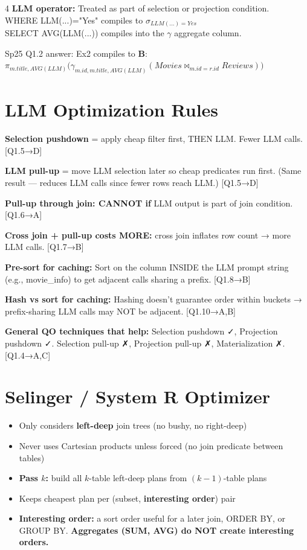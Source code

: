 \documentclass[8pt,letterpaper]{article}
\newcommand{\codefont}{\fontsize{4.2}{4.8}\selectfont\ttfamily}
\newcommand{\key}[1]{\textbf{\color{red!70!black}#1}}
\newcommand{\warn}[1]{\textbf{\color{orange!85!black}#1}}
\newcommand{\sql}[1]{{\codefont #1}}
\newcommand{\qref}[1]{{\fontsize{3.5}{4}\selectfont\color{purple!60!black}[#1]}}
\newcommand{\proj}{\ensuremath{\pi}}
\newcommand{\sel}{\ensuremath{\sigma}}
\newcommand{\agg}{\ensuremath{\gamma}}
\newcommand{\jn}{\ensuremath{\bowtie}}
\begin{document}
\begin{multicols*}{4}
\key{LLM operator:} Treated as part of selection or projection condition.\\
\sql{WHERE LLM(...)="Yes"} compiles to $\sel_{LLM(...)=Yes}$\\
\sql{SELECT AVG(LLM(...))} compiles into the $\agg$ aggregate column.

\begin{ansbox}
Sp25 Q1.2 answer: Ex2 compiles to \textbf{B}:\\
$\proj_{m.title,AVG(LLM)}\bigl(\agg_{m.id,m.title,AVG(LLM)}(Movies \jn_{m.id=r.id} Reviews)\bigr)$
\end{ansbox}

\section{LLM Optimization Rules}
\key{Selection pushdown} = apply cheap filter first, THEN LLM. Fewer LLM calls. \qref{Q1.5→D}

\key{LLM pull-up} = move LLM selection later so cheap predicates run first. (Same result — reduces LLM calls since fewer rows reach LLM.) \qref{Q1.5→D}

\key{Pull-up through join: CANNOT if} LLM output is part of join condition. \qref{Q1.6→A}

\key{Cross join + pull-up costs MORE:} cross join inflates row count → more LLM calls. \qref{Q1.7→B}

\key{Pre-sort for caching:} Sort on the column INSIDE the LLM prompt string (e.g., \sql{movie\_info}) to get adjacent calls sharing a prefix. \qref{Q1.8→B}

\key{Hash vs sort for caching:} Hashing doesn't guarantee order within buckets → prefix-sharing LLM calls may NOT be adjacent. \qref{Q1.10→A,B}

\key{General QO techniques that help:} Selection pushdown ✓, Projection pushdown ✓. Selection pull-up ✗, Projection pull-up ✗, Materialization ✗. \qref{Q1.4→A,C}

\section{Selinger / System R Optimizer}
\begin{itemize}
  \item Only considers \textbf{left-deep} join trees (no bushy, no right-deep)
  \item Never uses Cartesian products unless forced (no join predicate between tables)
  \item \textbf{Pass $k$:} build all $k$-table left-deep plans from $(k{-}1)$-table plans
  \item Keeps cheapest plan per (subset, \textbf{interesting order}) pair
  \item \textbf{Interesting order:} a sort order useful for a later join, ORDER BY, or GROUP BY. \warn{Aggregates (SUM, AVG) do NOT create interesting orders.}
\end{itemize}


\end{multicols*}
\end{document}
